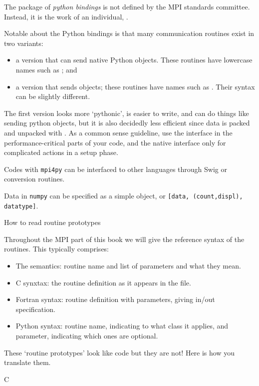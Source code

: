 The  package of \emph{python bindings}
is not defined by the MPI
standards committee. Instead, it is the work of an individual,
.

Notable about the Python bindings is that many communication routines
exist in two variants:
\begin{itemize}
\item a version that can send native Python objects. These routines
  have lowercase names such as ; and
\item a version that sends  objects; these routines
  have names such as . Their syntax can be slightly different.
\end{itemize}
The first version looks more `pythonic', is easier to write,
and can do things like sending python objects,
but it is also decidedly less efficient since data is packed
and unpacked with . As a common sense guideline,
use the  interface in the performance-critical parts
of your code, and the native interface only for complicated
actions in a setup phase.

Codes with \texttt{mpi4py} can be interfaced to other languages
through Swig or conversion routines.

Data in \texttt{numpy} can be specified as a simple object,
or \texttt{[data, (count,displ), datatype]}.


 {How to read routine prototypes}
\label{sec:protos}

Throughout the MPI part of this book we will give the reference syntax
of the routines. This typically comprises:
\begin{itemize}
\item The semantics: routine name and list of parameters and what they
  mean.
\item C synxtax: the routine definition as it appears in the
   file.
\item Fortran syntax: routine definition with parameters, giving
  in/out specification.
\item Python syntax: routine name, indicating to what class it
  applies, and parameter, indicating which ones are optional.
\end{itemize}

These `routine prototypes' look like code but they are not! Here is
how you translate them.

 {C}


